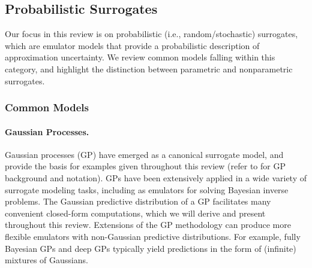 \documentclass[12pt]{article}
\begin{document}
\subsection{Probabilistic Surrogates}
Our focus in this review is on probabilistic (i.e., random/stochastic) surrogates, which 
are emulator models that provide a probabilistic description of approximation uncertainty.
We review common models falling within this category, and highlight the distinction
between parametric and nonparametric surrogates. 

\subsubsection{Common Models}

\paragraph{Gaussian Processes.}
Gaussian processes (GP) have emerged as a canonical surrogate model, and provide the 
basis for examples given throughout this review (refer to  for GP
background and notation). GPs have been extensively applied in a wide variety of 
surrogate modeling tasks, including as emulators for solving Bayesian inverse problems.
The Gaussian predictive distribution of a 
GP facilitates many convenient closed-form computations, which we will derive and present 
throughout this review. Extensions of the GP methodology can produce more flexible 
emulators with non-Gaussian predictive distributions. For example, fully Bayesian 
GPs \citep{fullyBayesianGPs} and deep GPs \citep{deepGPVecchia,deepGPAL}
typically yield predictions in the form of (infinite) mixtures of Gaussians.
\end{document}
